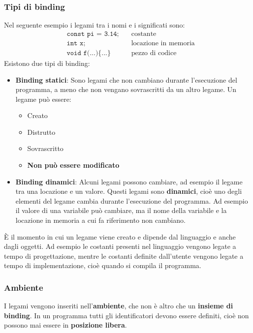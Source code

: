 \documentclass[a4paper]{article}
\begin{document}
\subsubsection{Tipi di binding}
Nel seguente esempio i legami tra i nomi e i significati sono:
\[
  \begin{aligned}
    &\texttt{const pi = 3.14;} \quad& \text{costante} \\
    &\texttt{int x;} \quad& \text{locazione in memoria} \\
    &\texttt{void f(...)\{...\}} \quad& \text{pezzo di codice}
  \end{aligned}
\] 
Esistono due tipi di binding:
\begin{itemize}
  \item \textbf{Binding statici}:
    Sono legami che non cambiano durante l'esecuzione del
    programma, a meno che non vengano sovrascritti da un altro legame. Un legame
    può essere:
    \begin{itemize}
      \item Creato
      \item Distrutto
      \item Sovrascritto
      \item \textbf{Non può essere modificato}
    \end{itemize}

  \item \textbf{Binding dinamici}:
    Alcuni legami possono cambiare, ad esempio il legame tra una locazione e un valore.
    Questi legami sono \textbf{dinamici}, cioè uno degli elementi del legame cambia
    durante l'esecuzione del programma. Ad esempio il valore di una variabile può
    cambiare, ma il nome della variabile e la locazione in memoria a cui fa riferimento
    non cambiano.
\end{itemize}

\begin{definition}
  È il momento in cui un legame viene creato e dipende dal linguaggio e anche dagli
  oggetti. Ad esempio le costanti presenti nel linguaggio vengono legate a tempo
  di progettazione, mentre le costanti definite dall'utente vengono legate a tempo di
  implementazione, cioè quando si compila il programma.
\end{definition}

\subsubsection{Ambiente}
I legami vengono inseriti nell'\textbf{ambiente}, che non è altro che un
\textbf{insieme di binding}. In un programma tutti gli identificatori devono essere
definiti, cioè non possono mai essere in \textbf{posizione libera}.
\end{document}
